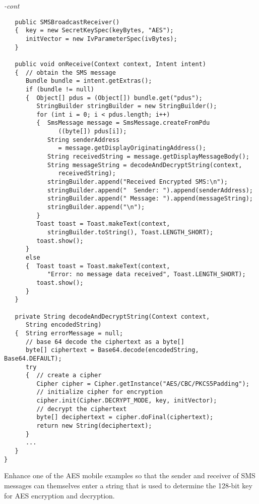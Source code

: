 \begin{figure*}\begin{program}\emph{-cont}\begin{verbatim}
   public SMSBroadcastReceiver()
   {  key = new SecretKeySpec(keyBytes, "AES");
      initVector = new IvParameterSpec(ivBytes);
   }

   public void onReceive(Context context, Intent intent)
   {  // obtain the SMS message
      Bundle bundle = intent.getExtras();
      if (bundle != null)
      {  Object[] pdus = (Object[]) bundle.get("pdus");
         StringBuilder stringBuilder = new StringBuilder();
         for (int i = 0; i < pdus.length; i++)
         {  SmsMessage message = SmsMessage.createFromPdu
               ((byte[]) pdus[i]);
            String senderAddress
               = message.getDisplayOriginatingAddress();
            String receivedString = message.getDisplayMessageBody();
            String messageString = decodeAndDecryptString(context,
               receivedString);
            stringBuilder.append("Received Encrypted SMS:\n");
            stringBuilder.append("  Sender: ").append(senderAddress);
            stringBuilder.append(" Message: ").append(messageString);
            stringBuilder.append("\n");
         }
         Toast toast = Toast.makeText(context,
            stringBuilder.toString(), Toast.LENGTH_SHORT);
         toast.show();
      }
      else
      {  Toast toast = Toast.makeText(context,
            "Error: no message data received", Toast.LENGTH_SHORT);
         toast.show();
      }
   }

   private String decodeAndDecryptString(Context context,
      String encodedString)
   {  String errorMessage = null;
      // base 64 decode the ciphertext as a byte[]
      byte[] ciphertext = Base64.decode(encodedString, Base64.DEFAULT);
      try
      {  // create a cipher
         Cipher cipher = Cipher.getInstance("AES/CBC/PKCS5Padding");
         // initialize cipher for encryption
         cipher.init(Cipher.DECRYPT_MODE, key, initVector);
         // decrypt the ciphertext
         byte[] deciphertext = cipher.doFinal(ciphertext);
         return new String(deciphertext);
      }
      ...
   }
}
\end{verbatim}\end{program}\end{figure*}


\begin{exercise}
Enhance one of the AES mobile examples so that the sender and receiver of SMS messages
can themselves enter a string that is used to determine the 128-bit key for AES encryption
and decryption.
\end{exercise}
